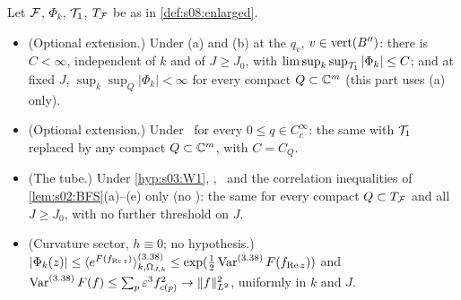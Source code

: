 \begin{lemma}\label{lem:s08:claim4}
Let $\mathcal F$, $\Phi_k$, $\mathcal T_1$, $T_{\mathcal F}$ be as in \cref{def:s08:enlarged}.
\begin{itemize}[leftmargin=*,nosep]
\item[(A)] \textup{(Optional extension.)} Under \Wtwo(a) and \Wtwo(b) at the $q_v$, $v\in\operatorname{vert}(B'')$: there is $C<\infty$, independent of $k$ and of $J\ge J_0$, with $\limsup_k\sup_{\mathcal T_1}|\Phi_k|\le C$; and at fixed $J$, $\sup_k\sup_Q|\Phi_k|<\infty$ for every compact $Q\subset\mathbb C^m$ (this part uses \Wtwo(a) only).
\item[(A$_\infty$)] \textup{(Optional extension.)} Under \Wtwo\ for every $0\le q\in C^\infty_c$: the same with $\mathcal T_1$ replaced by any compact $Q\subset\mathbb C^m$, with $C=C_Q$.
\item[(T)] \textup{(The tube.)} Under \cref{hyp:s03:W1}, \Itwo, \Ithree\ and the correlation inequalities of \cref{lem:s02:BFS}(a)--(e) only (no \Wtwo): the same for every compact $Q\subset T_{\mathcal F}$ and all $J\ge J_0$, with no further threshold on $J$.
\item[(C)] \textup{(Curvature sector, $h\equiv0$; no hypothesis.)} $|\Phi_k(z)|\le\langle e^{F(f_{\operatorname{Re} z})}\rangle^{(3.38)}_{k,\Omega_{J,k}}\le\exp(\tfrac12\operatorname{Var}^{(3.38)}F(f_{\operatorname{Re} z}))$ and $\operatorname{Var}^{(3.38)}F(f)\le\sum_p\varepsilon^3f_{c(p)}^2\to\lVert f\rVert_{L^2}^2$, uniformly in $k$ and $J$.
\end{itemize}
\end{lemma}

